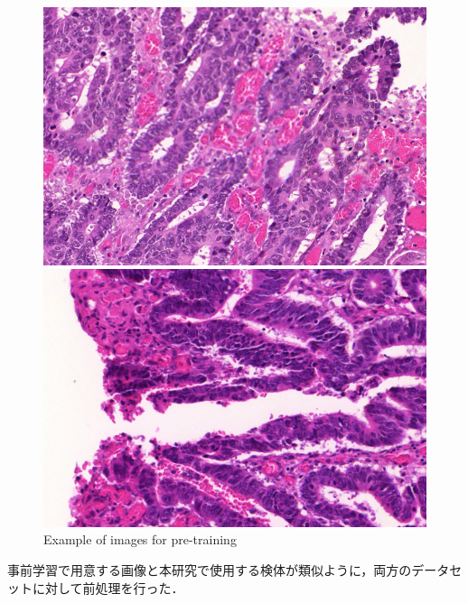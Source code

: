 \begin{figure}[H]
	\begin{minipage}[b]{0.4\columnwidth}
		\centering
		\includegraphics[clip, width=\linewidth]{fig/chapter2/pretrain_image/testA_12.bmp}
	\end{minipage}
	\hspace{5truemm}
	\begin{minipage}[b]{0.4\columnwidth}
		\centering
		\includegraphics[clip, width=\linewidth]{fig/chapter2/pretrain_image/train_77.bmp}
	\end{minipage}
	
	\caption{Example of images for pre-training}
	\label{fig:事前学習画像}
	
\end{figure}

事前学習で用意する画像と本研究で使用する検体が類似ように，両方のデータセットに対して前処理を行った．

